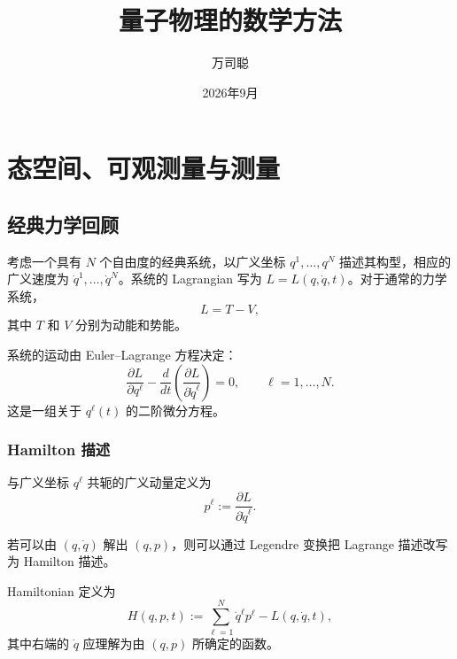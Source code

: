 \documentclass[UTF8,a4paper,11pt,openany]{ctexbook}
\title{量子物理的数学方法}
\author{万司聪}
\date{2026年9月}
\begin{document}
\frontmatter

\maketitle
\setcounter{tocdepth}{1}
\tableofcontents

\mainmatter

\chapter{态空间、可观测量与测量}

\section{经典力学回顾}

考虑一个具有 $N$ 个自由度的经典系统，以广义坐标 $q^1,\ldots,q^N$ 描述其构型，相应的广义速度为 $\dot q^1,\ldots,\dot q^N$。系统的 Lagrangian 写为 $L=L(q,\dot q,t)$。对于通常的力学系统，
\[
L=T-V,
\]
其中 $T$ 和 $V$ 分别为动能和势能。

系统的运动由 Euler--Lagrange 方程决定：
\begin{equation}
    \frac{\partial L}{\partial q^\ell}
    -
    \frac{d}{dt}
    \left(
        \frac{\partial L}{\partial \dot q^\ell}
    \right)
    =0,
    \qquad
    \ell=1,\ldots,N.
\end{equation}
这是一组关于 $q^\ell(t)$ 的二阶微分方程。

\subsection{Hamilton 描述}

\begin{definition}[广义动量]
与广义坐标 $q^\ell$ 共轭的广义动量定义为
\begin{equation}
    p^\ell
    :=
    \frac{\partial L}{\partial \dot q^\ell}.
\end{equation}
\end{definition}

若可以由 $(q,\dot q)$ 解出 $(q,p)$，则可以通过 Legendre 变换把 Lagrange 描述改写为 Hamilton 描述。

\begin{definition}[Hamiltonian]
Hamiltonian 定义为
\begin{equation}
    H(q,p,t)
    :=
    \sum_{\ell=1}^{N}
    \dot q^\ell p^\ell
    -
    L(q,\dot q,t),
\end{equation}
其中右端的 $\dot q$ 应理解为由 $(q,p)$ 所确定的函数。
\end{definition}
\end{document}
